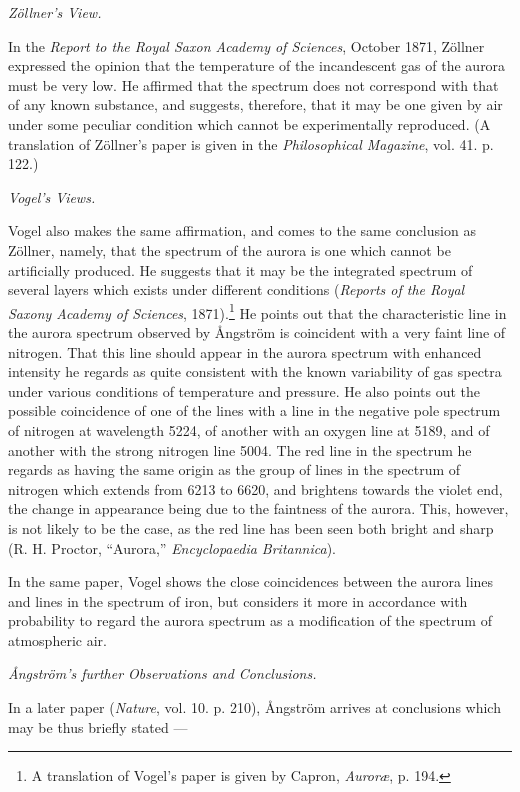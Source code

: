 \documentclass[a4paper, 12pt, oneside, polutonikogreek, english]{article}
\begin{document}
\emph{Zöllner's View.}

In the \emph{Report to the Royal Saxon Academy of Sciences}, October 1871, Zöllner expressed the opinion that the temperature of the incandescent gas of the aurora must be very low. He affirmed that the spectrum does not correspond with that of any known substance, and suggests, therefore, that it may be one given by air under some peculiar condition which cannot be experimentally reproduced. (A translation of Zöllner's paper is given in the \emph{Philosophical Magazine}, vol. 41. p. 122.)

\emph{Vogel's Views.}

Vogel also makes the same affirmation, and comes to the same conclusion as Zöllner, namely, that the spectrum of the aurora is one which cannot be artificially produced. He suggests that it may be the integrated spectrum of several layers which exists under different conditions (\emph{Reports of the Royal Saxony Academy of Sciences}, 1871).\footnote{A translation of Vogel's paper is given by Capron, \emph{Auroræ}, p. 194.} He points out that the characteristic line in the aurora spectrum observed by Ångström is coincident with a very faint line of nitrogen. That this line should appear in the aurora spectrum with enhanced intensity he regards as quite consistent with the known variability of gas spectra under various conditions of temperature and pressure. He also points out the possible coincidence of one of the lines with a line in the negative pole spectrum of nitrogen at wavelength 5224, of another with an oxygen line at 5189, and of another with the strong nitrogen line 5004. The red line in the spectrum he regards as having the same origin as the group of lines in the spectrum of nitrogen which extends from 6213 to 6620, and brightens towards the violet end, the change in appearance being due to the faintness of the aurora. This, however, is not likely to be the case, as the red line has been seen both bright and sharp (R. H. Proctor, ``Aurora,'' \emph{Encyclopaedia Britannica}).

In the same paper, Vogel shows the close coincidences between the aurora lines and lines in the spectrum of iron, but considers it more in accordance with probability to regard the aurora spectrum as a modification of the spectrum of atmospheric air.

\emph{Ångström's further Observations and Conclusions.}

In a later paper (\emph{Nature}, vol. 10. p. 210), Ångström arrives at conclusions which may be thus briefly stated ---
\end{document}

